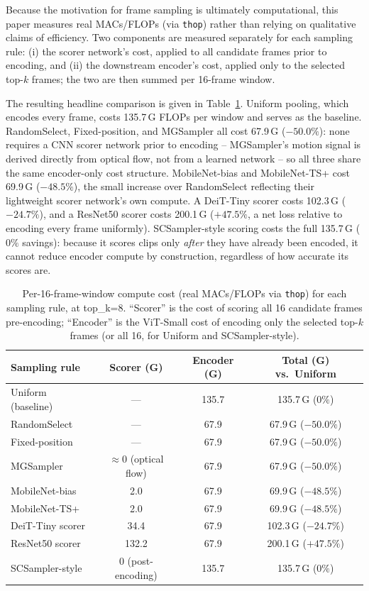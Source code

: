\documentclass[preprint,12pt]{elsarticle}
\begin{document}
Because the motivation for frame sampling is ultimately computational, this paper measures real MACs/FLOPs (via \texttt{thop}) rather than relying on qualitative claims of efficiency. Two components are measured separately for each sampling rule: (i) the scorer network's cost, applied to all candidate frames prior to encoding, and (ii) the downstream encoder's cost, applied only to the selected top-$k$ frames; the two are then summed per 16-frame window.

The resulting headline comparison is given in Table~\ref{tab:flops}. Uniform pooling, which encodes every frame, costs 135.7\,G FLOPs per window and serves as the baseline. RandomSelect, Fixed-position, and MGSampler all cost 67.9\,G ($-50.0\%$): none requires a CNN scorer network prior to encoding -- MGSampler's motion signal is derived directly from optical flow, not from a learned network -- so all three share the same encoder-only cost structure. MobileNet-bias and MobileNet-TS+ cost 69.9\,G ($-48.5\%$), the small increase over RandomSelect reflecting their lightweight scorer network's own compute. A DeiT-Tiny scorer costs 102.3\,G ($-24.7\%$), and a ResNet50 scorer costs 200.1\,G ($+47.5\%$, a net loss relative to encoding every frame uniformly). SCSampler-style scoring costs the full 135.7\,G ($0\%$ savings): because it scores clips only \emph{after} they have already been encoded, it cannot reduce encoder compute by construction, regardless of how accurate its scores are.

\begin{table}[t]
\centering
\caption{Per-16-frame-window compute cost (real MACs/FLOPs via \texttt{thop}) for each sampling rule, at top\_k=8. ``Scorer'' is the cost of scoring all 16 candidate frames pre-encoding; ``Encoder'' is the ViT-Small cost of encoding only the selected top-$k$ frames (or all 16, for Uniform and SCSampler-style).}
\label{tab:flops}
\begin{tabular}{lccc}
\toprule
Sampling rule & Scorer (G) & Encoder (G) & Total (G) vs.\ Uniform \\
\midrule
Uniform (baseline) & --- & 135.7 & 135.7\,G ($0\%$) \\
RandomSelect & --- & 67.9 & 67.9\,G ($-50.0\%$) \\
Fixed-position & --- & 67.9 & 67.9\,G ($-50.0\%$) \\
MGSampler & $\approx$0 (optical flow) & 67.9 & 67.9\,G ($-50.0\%$) \\
MobileNet-bias & 2.0 & 67.9 & 69.9\,G ($-48.5\%$) \\
MobileNet-TS+ & 2.0 & 67.9 & 69.9\,G ($-48.5\%$) \\
DeiT-Tiny scorer & 34.4 & 67.9 & 102.3\,G ($-24.7\%$) \\
ResNet50 scorer & 132.2 & 67.9 & 200.1\,G ($+47.5\%$) \\
SCSampler-style & 0 (post-encoding) & 135.7 & 135.7\,G ($0\%$) \\
\bottomrule
\end{tabular}
\end{table}
\end{document}
